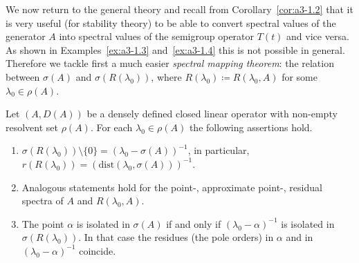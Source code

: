 We now return to the general theory and recall from Corollary~\ref{cor:a3-1.2} that it is very useful (\eg for stability theory) to be able to convert
spectral values of the generator $A$ into spectral values of the semigroup operator $T(t)$ and vice versa.
As shown in Examples~\ref{ex:a3-1.3} and~\ref{ex:a3-1.4} this is not possible in general.
Therefore we tackle first a much easier \emph{spectral mapping theorem}: the relation between $\sigma(A)$ and $\sigma(R(\lambda_{0}))$, where $R(\lambda_{0}) \coloneq R(\lambda_{0},A)$ for some $\lambda_{0} \in \rho(A)$.
\begin{proposition}\label{prop:a3-2.5}
Let $(A,D(A))$ be a densely defined closed linear operator with non-empty resolvent set $\rho(A)$.
For each $\lambda_{0} \in \rho(A)$ the following assertions hold.
\begin{enumerate}[\upshape (i)]
\item 
$\sigma(R(\lambda_{0})) \setminus \{0\} = (\lambda_{0} - \sigma(A))^{-1}$, in  particular, $r(R(\lambda_{0})) = (\mathrm{dist}(\lambda_{0},\sigma(A)))^{-1}$.

\item 
Analogous statements hold for the point-, approximate point-, residual spectra of\/ $A$ and $R(\lambda_{0},A)$.

\item 
The point $\alpha$ is isolated in $\sigma(A)$ if and only if\/ $(\lambda_{0}-\alpha)^{-1}$ is isolated in $\sigma(R(\lambda_{0}))$.
In that case the residues (\resp the pole orders) in $\alpha$ and in $(\lambda_{0}-\alpha)^{-1}$ coincide.
\end{enumerate}
\end{proposition}
